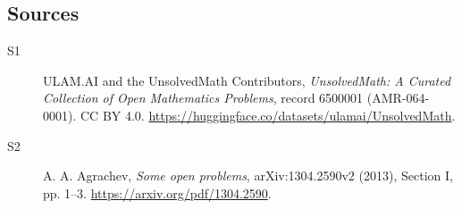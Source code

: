 \documentclass[11pt]{article}
\begin{document}
\subsection{Sources}
\begin{description}
\item[\hypertarget{source:6500001:1}{S1}] ULAM.AI and the UnsolvedMath Contributors, \emph{UnsolvedMath: A Curated Collection of Open Mathematics Problems}, record 6500001 (AMR-064-0001). CC BY 4.0. \url{https://huggingface.co/datasets/ulamai/UnsolvedMath}.
\item[\hypertarget{source:6500001:2}{S2}] A. A. Agrachev, \emph{Some open problems}, arXiv:1304.2590v2 (2013), Section I, pp. 1--3. \url{https://arxiv.org/pdf/1304.2590}.
\end{description}
\label{end:6500001}
\end{document}
